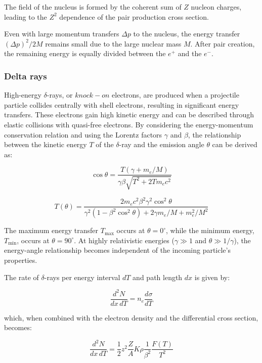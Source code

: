 The field of the nucleus is formed by the coherent sum of $Z$ 
nucleon charges, leading to the $Z^2$ dependence of the pair 
production cross section.

Even with large momentum transfers $\Delta p$ to the nucleus, 
the energy transfer $(\Delta p)^2/2M$ remains small due to the 
large nuclear mass $M$. After pair creation, the remaining 
energy is equally divided between the $e^+$ and the $e^-$.

\subsubsection{Delta rays}
High-energy $\delta$-rays, or $knock-on$ electrons, 
are produced when a projectile particle collides 
centrally with shell electrons, resulting in 
significant energy transfers. These electrons 
gain high kinetic energy and can be described 
through elastic collisions with quasi-free electrons. 
By considering the energy-momentum conservation relation 
and using the Lorentz factors $\gamma$ and $\beta$, the 
relationship between the kinetic energy $T$ of the 
$\delta$-ray and the emission angle $\theta$ can be derived as:

\begin{equation}
\cos \theta = \frac{T(\gamma + m_e / M)}{\gamma \beta \sqrt{T^2 + 2T m_e c^2}}
\end{equation}

\begin{equation}
T(\theta) = \frac{2 m_e c^2 \beta^2 \gamma^2 \cos^2 \theta}{\gamma^2(1 - \beta^2 \cos^2 \theta) + 2 \gamma m_e / M + m_e^2 / M^2}
\end{equation}

The maximum energy transfer $T_{\text{max}}$ occurs at $\theta = 0^\circ$, 
while the minimum energy, $T_{\text{min}}$, occurs at $\theta = 90^\circ$. 
At highly relativistic energies ($\gamma \gg 1$ and $\theta \gg 1/\gamma$), 
the energy-angle relationship becomes independent of the incoming particle's properties.

The rate of $\delta$-rays per energy interval $dT$ and path length $dx$ is given by:

\begin{equation}
\frac{d^2 N}{dx \, dT} = n_e \frac{d\sigma}{dT}
\end{equation}

which, when combined with the electron density and the differential cross section, becomes:

\begin{equation}
\frac{d^2 N}{dx \, dT} = \frac{1}{2} z^2 \frac{Z}{A} K \rho \frac{1}{\beta^2} \frac{F(T)}{T^2}
\end{equation}

